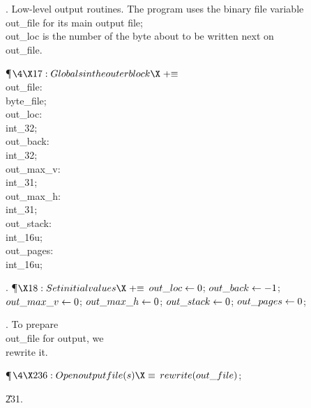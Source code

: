 .  Low-level output routines.
The program uses the binary file variable \\{out\_file} for its main output
file; \\{out\_loc} is the number of the byte about to be written next on
\\{out\_file}.

\Y\P$\4\X17:Globals in the outer block\X\mathrel{+}\S$\6
\4\\{out\_file}: \\{byte\_file};\6
\4\\{out\_loc}: \\{int\_32};\6
\4\\{out\_back}: \\{int\_32};\6
\4\\{out\_max\_v}: \\{int\_31};\6
\4\\{out\_max\_h}: \\{int\_31};\6
\4\\{out\_stack}: \\{int\_16u};\6
\4\\{out\_pages}: \\{int\_16u};\par
\fi

. \P$\X18:Set initial values\X\mathrel{+}\S$\6
$\\{out\_loc}\gets0$;\5
$\\{out\_back}\gets-1$;\5
$\\{out\_max\_v}\gets0$;\5
$\\{out\_max\_h}\gets0$;\5
$\\{out\_stack}\gets0$;\5
$\\{out\_pages}\gets0$;\par
\fi

. To prepare \\{out\_file} for output, we \\{rewrite} it.

\Y\P$\4\X236:Open output file(s)\X\S$\6
$\\{rewrite}(\\{out\_file})$;\par
\U231.\fi

